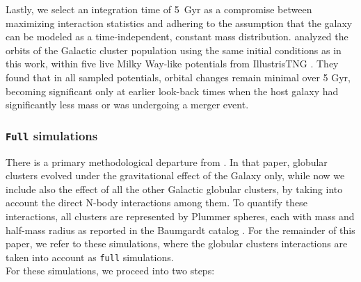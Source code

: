 \documentclass{aa}
\begin{document}
    Lastly, we select an integration time of 5~Gyr as a compromise between maximizing interaction statistics and adhering to the assumption that the galaxy can be modeled as a time-independent, constant mass distribution. \citet{2023A&A...673A.152I} analyzed the orbits of the Galactic cluster population using the same initial conditions as in this work, within five live Milky Way-like potentials from IllustrisTNG \citep{2018MNRAS.473.4077P}. They found that in all sampled potentials, orbital changes remain minimal over 5 Gyr, becoming significant only at earlier look-back times when the host galaxy had significantly less mass or was undergoing a merger event.




    \subsubsection*{ \texttt{Full} simulations}
    There is a primary methodological departure from \citet{2023A&A...673A..44F}.  In that paper, globular clusters evolved under the gravitational effect of the Galaxy only, while now we include also the effect of all the other Galactic globular clusters, by taking into account the direct N-body interactions among them. To quantify these interactions, all clusters are represented by Plummer spheres, each with mass and half-mass radius as reported in the Baumgardt catalog \citep{2021MNRAS.505.5957B}. For the remainder of this paper, we refer to these simulations, where the globular clusters interactions are taken into account as \texttt{full} simulations. \\
    For these simulations, we proceed into two steps:
\end{document}

